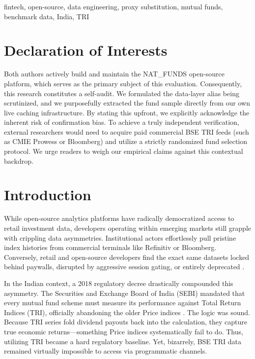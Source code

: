 \documentclass[conference]{IEEEtran}
\begin{document}
\begin{IEEEkeywords}
fintech, open-source, data engineering, proxy substitution, mutual funds, benchmark data, India, TRI
\end{IEEEkeywords}

\section*{Declaration of Interests}
Both authors actively build and maintain the NAT\_FUNDS open-source platform, which serves as the primary subject of this evaluation. Consequently, this research constitutes a self-audit. We formulated the data-layer alias being scrutinized, and we purposefully extracted the fund sample directly from our own live caching infrastructure. By stating this upfront, we explicitly acknowledge the inherent risk of confirmation bias. To achieve a truly independent verification, external researchers would need to acquire paid commercial BSE TRI feeds (such as CMIE Prowess or Bloomberg) and utilize a strictly randomized fund selection protocol. We urge readers to weigh our empirical claims against this contextual backdrop.

\section{Introduction}

While open-source analytics platforms have radically democratized access to retail investment data, developers operating within emerging markets still grapple with crippling data asymmetries. Institutional actors effortlessly pull pristine index histories from commercial terminals like Refinitiv or Bloomberg. Conversely, retail and open-source developers find the exact same datasets locked behind paywalls, disrupted by aggressive session gating, or entirely deprecated \cite{milan2020}.

In the Indian context, a 2018 regulatory decree drastically compounded this asymmetry. The Securities and Exchange Board of India (SEBI) mandated that every mutual fund scheme must measure its performance against Total Return Indices (TRI), officially abandoning the older Price indices \cite{sebi2018}. The logic was sound. Because TRI series fold dividend payouts back into the calculation, they capture true economic returns---something Price indices systematically fail to do. Thus, utilizing TRI became a hard regulatory baseline. Yet, bizarrely, BSE TRI data remained virtually impossible to access via programmatic channels.
\end{document}
